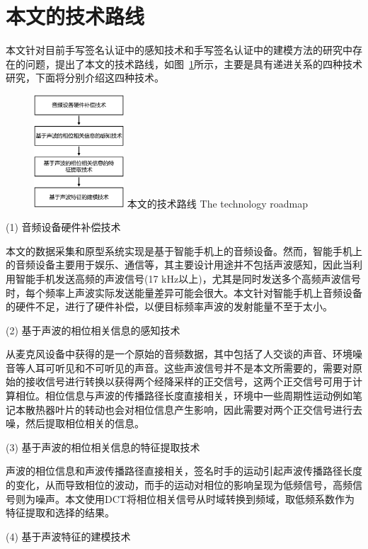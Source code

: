 \section{本文的技术路线}

本文针对目前手写签名认证中的感知技术和手写签名认证中的建模方法的研究中存在的问题，提出了本文的技术路线，如图~\ref{fig:technology-roadmap}所示，主要是具有递进关系的四种技术研究，下面将分别介绍这四种技术。
\begin{figure}[!htp]
  \centering
  \includegraphics[width=0.3\textwidth]{figure/technique-road.pdf}
  \bicaption
    {本文的技术路线}
    {The technology roadmap}
  \label{fig:technology-roadmap}
\end{figure}

(1) 音频设备硬件补偿技术

本文的数据采集和原型系统实现是基于智能手机上的音频设备。然而，智能手机上的音频设备主要用于娱乐、通信等，其主要设计用途并不包括声波感知，因此当利用智能手机发送高频的声波信号(17 kHz以上)，尤其是同时发送多个高频声波信号时，每个频率上声波实际发送能量差异可能会很大。本文针对智能手机上音频设备的硬件不足，进行了硬件补偿，以便目标频率声波的发射能量不至于太小。

(2) 基于声波的相位相关信息的感知技术

从麦克风设备中获得的是一个原始的音频数据，其中包括了人交谈的声音、环境噪音等人耳可听见和不可听见的声音。这些声波信号并不是本文所需要的，需要对原始的接收信号进行转换以获得两个经降采样的正交信号，这两个正交信号可用于计算相位。相位信息与声波的传播路径长度直接相关，环境中一些周期性运动例如笔记本散热器叶片的转动也会对相位信息产生影响，因此需要对两个正交信号进行去噪，然后提取相位相关的信息。

(3) 基于声波的相位相关信息的特征提取技术

声波的相位信息和声波传播路径直接相关，签名时手的运动引起声波传播路径长度的变化，从而导致相位的波动，而手的运动对相位的影响呈现为低频信号，高频信号则为噪声。本文使用DCT将相位相关信号从时域转换到频域，取低频系数作为特征提取和选择的结果。

(4) 基于声波特征的建模技术

